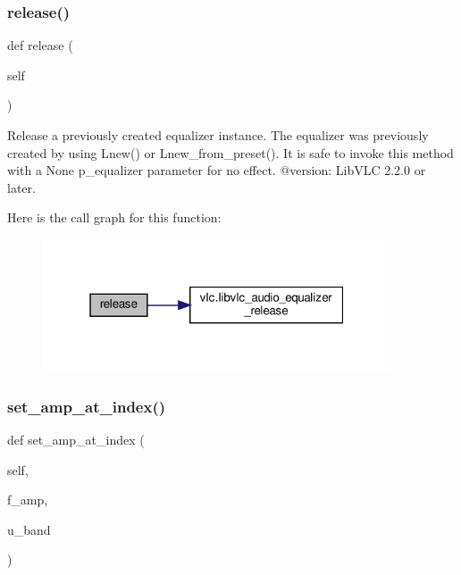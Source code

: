 \subsubsection{\texorpdfstring{release()}{release()}}
{\footnotesize\ttfamily def release (\begin{DoxyParamCaption}\item[{}]{self }\end{DoxyParamCaption})}

\begin{DoxyVerb}Release a previously created equalizer instance.
The equalizer was previously created by using L{new}() or
L{new_from_preset}().
It is safe to invoke this method with a None p_equalizer parameter for no effect.
@version: LibVLC 2.2.0 or later.
\end{DoxyVerb}
 Here is the call graph for this function\+:
\nopagebreak
\begin{figure}[H]
\begin{center}
\leavevmode
\includegraphics[width=292pt]{classvlc_1_1_audio_equalizer_a4cd51e19135e5ad4a19eae3ea9c60537_cgraph}
\end{center}
\end{figure}
\mbox{\label{classvlc_1_1_audio_equalizer_aab7e0f4d960155c9ae37a54e56991124}} 
\subsubsection{\texorpdfstring{set\+\_\+amp\+\_\+at\+\_\+index()}{set\_amp\_at\_index()}}
{\footnotesize\ttfamily def set\+\_\+amp\+\_\+at\+\_\+index (\begin{DoxyParamCaption}\item[{}]{self,  }\item[{}]{f\+\_\+amp,  }\item[{}]{u\+\_\+band }\end{DoxyParamCaption})}

